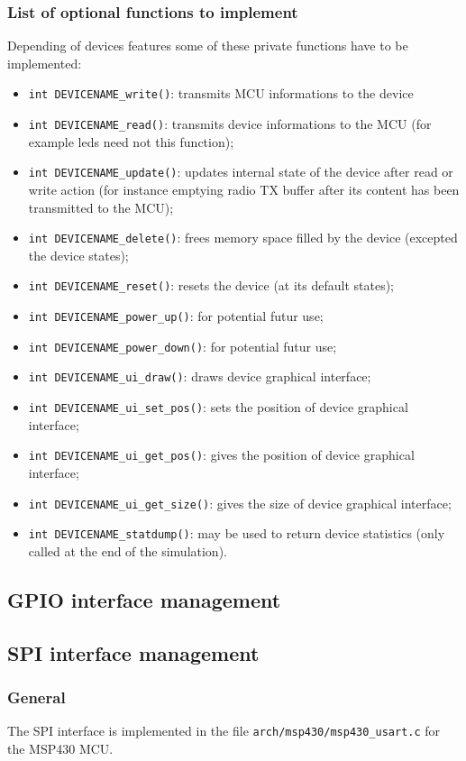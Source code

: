 \documentclass[a4paper,10pt]{report}
\begin{document}
\subsubsection{List of optional functions to implement}
Depending of devices features some of these private functions have to be implemented:
\begin{itemize}
  \item \verb$int DEVICENAME_write()$: transmits MCU informations to the device
  \item \verb$int DEVICENAME_read()$: transmits device informations to the MCU (for example leds need not this function);
  \item \verb$int DEVICENAME_update()$: updates internal state of the device after read or write action (for instance emptying radio TX buffer after its content has been transmitted to the MCU);
  \item \verb$int DEVICENAME_delete()$: frees memory space filled by the device (excepted the device states);
  \item \verb$int DEVICENAME_reset()$: resets the device (at its default states);
  \item \verb$int DEVICENAME_power_up()$: for potential futur use;
  \item \verb$int DEVICENAME_power_down()$: for potential futur use;
  \item \verb$int DEVICENAME_ui_draw()$: draws device graphical interface;
  \item \verb$int DEVICENAME_ui_set_pos()$: sets the position of device graphical interface;
  \item \verb$int DEVICENAME_ui_get_pos()$: gives the position of device graphical interface;
  \item \verb$int DEVICENAME_ui_get_size()$: gives the size of device graphical interface;
  \item \verb$int DEVICENAME_statdump()$: may be used to return device statistics (only called at the end of the simulation).
\end{itemize}

\subsection{GPIO interface management}

\subsection{SPI interface management}
\subsubsection{General}
The SPI interface is implemented in the file \verb$arch/msp430/msp430_usart.c$ for the MSP430 MCU.
\end{document}
